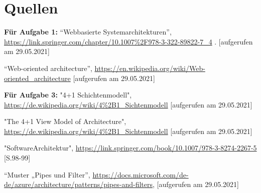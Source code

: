 \section{Quellen}
\begin{enumerate}[{[1]}]
    \item  \textbf{Für Aufgabe 1:} ``Webbasierte Systemarchitekturen'', \url{https://link.springer.com/chapter/10.1007%2F978-3-322-89822-7_4} .
[aufgerufen am 29.05.2021]
    \item ``Web-oriented architecture'', \url{https://en.wikipedia.org/wiki/Web-oriented_architecture} [aufgerufen am 29.05.2021]
    \item \textbf{Für Aufgabe 3:} "4+1 Schichtenmodell",
    \url{https://de.wikipedia.org/wiki/4%2B1_Sichtenmodell} [aufgerufen am 29.05.2021]
    \item "The 4+1 View Model of Architecture",
    \url{https://de.wikipedia.org/wiki/4%2B1_Sichtenmodell} [aufgerufen am 29.05.2021]
        \item "SoftwareArchitektur",
    \url{https://link.springer.com/book/10.1007/978-3-8274-2267-5} [S.98-99]
    
    \item ``Muster „Pipes und Filter'', \url{https://docs.microsoft.com/de-de/azure/architecture/patterns/pipes-and-filters}, [aufgerufen am 29.05.2021]
\end{enumerate}


